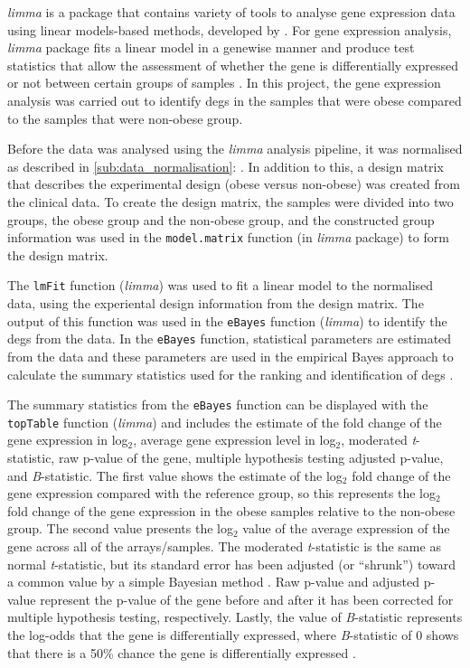 \textit{limma} is a package that contains variety of tools to analyse gene expression data using linear models-based methods, developed by \citet{Ritchie2015}.
For gene expression analysis, \textit{limma} package fits a linear model in a genewise manner and produce test statistics that allow the assessment of whether the gene is differentially expressed or not between certain groups of samples \citep{Ritchie2015}.
In this project, the gene expression analysis was carried out to identify \glspl{deg} in the samples that were obese compared to the samples that were non-obese group.

Before the data was analysed using the \textit{limma} analysis pipeline, it was normalised as described in \cref{sub:data_normalisation}: .
In addition to this, a design matrix that describes the experimental design (obese versus non-obese) was created from the clinical data.
To create the design matrix, the samples were divided into two groups, the obese group and the non-obese group, and the constructed group information was used in the \texttt{model.matrix} function (in \textit{limma} package) to form the design matrix.

The \texttt{lmFit} function (\textit{limma}) was used to fit a linear model to the normalised data, using the experiental design information from the design matrix.
The output of this function was used in the \texttt{eBayes} function (\textit{limma}) to identify the \glspl{deg} from the data.
In the \texttt{eBayes} function, statistical parameters are estimated from the data and these parameters are used in the empirical Bayes approach to calculate the summary statistics used for the ranking and identification of \glspl{deg} \citep{Smyth2004}.

The summary statistics from the \texttt{eBayes} function can be displayed with the \texttt{topTable} function (\textit{limma}) and includes the estimate of the fold change of the gene expression in log$_2$, average gene expression level in log$_2$, moderated \textit{t}-statistic, raw p-value of the gene, multiple hypothesis testing adjusted p-value, and \textit{B}-statistic.
The first value shows the estimate of the log$_2$ fold change of the gene expression compared with the reference group, so this represents the log$_2$ fold change of the gene expression in the obese samples relative to the non-obese group.
The second value presents the log$_2$ value of the average expression of the gene across all of the arrays/samples.
The moderated \textit{t}-statistic is the same as normal \textit{t}-statistic, but its standard error has been adjusted (or ``shrunk'') toward a common value by a simple Bayesian method \citep{Smyth2005}.
Raw p-value and adjusted p-value represent the p-value of the gene before and after it has been corrected for multiple hypothesis testing, respectively.
Lastly, the value of \textit{B}-statistic represents the log-odds that the gene is differentially expressed, where \textit{B}-statistic of 0 shows that there is a 50\% chance the gene is differentially expressed \citep{Smyth2005}.

